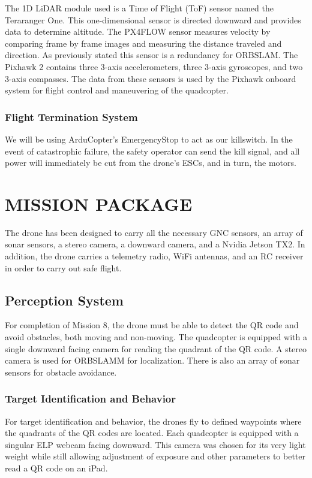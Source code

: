 \documentclass[12pt,letterpaper]{article}
\begin{document}
			The 1D LiDAR module used is a Time of Flight (ToF) sensor named the Teraranger One. This one-dimensional sensor is directed downward and provides data to determine altitude. The PX4FLOW sensor measures velocity by comparing frame by frame images and measuring the distance traveled and direction. As previously stated this sensor is a redundancy for ORBSLAM. The Pixhawk 2 contains three 3-axis accelerometers, three 3-axis gyroscopes, and two 3-axis compasses. The data from these sensors is used by the Pixhawk onboard system for flight control and maneuvering of the quadcopter.


		\subsubsection*{Flight Termination System}
			We will be using ArduCopter's EmergencyStop to act as our killswitch. In the event of catastrophic failure, the safety operator can send the kill signal, and all power will immediately be cut from the drone's ESCs, and in turn, the motors.


\section*{MISSION PACKAGE}
	The drone has been designed to carry all the necessary GNC sensors, an array of sonar sensors, a stereo camera, a downward camera, and a Nvidia Jetson TX2. In addition, the drone carries a telemetry radio, WiFi antennas, and an RC receiver in order to carry out safe flight.
	\subsection*{Perception System}
	For completion of Mission 8, the drone must be able to detect the QR code and avoid obstacles, both moving and non-moving. The quadcopter is equipped with a single downward facing camera for reading the quadrant of the QR code. A stereo camera is used for ORBSLAMM for localization. There is also an array of sonar sensors for obstacle avoidance.

		\subsubsection*{Target Identification and Behavior}
			For target identification and behavior, the drones fly to defined waypoints where the quadrants of the QR codes are located. Each quadcopter is equipped with a singular ELP webcam facing downward. This camera was chosen for its very light weight while still allowing adjustment of exposure and other parameters to better read a QR code on an iPad.
\end{document}
